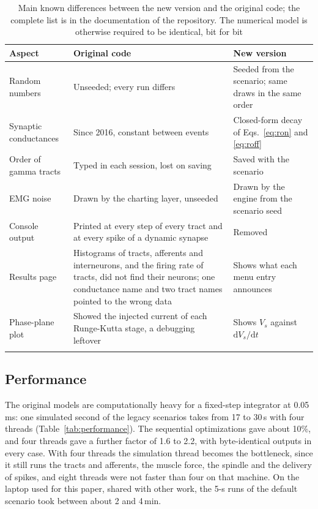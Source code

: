 \documentclass[pdflatex,sn-apa,iicol]{sn-jnl}
\providecommand{\dd}{\mathrm{d}}
\begin{document}
\begin{table}[t]
\caption{Main known differences between the new version and the original code; the complete list is in the documentation of the repository. The numerical model is otherwise required to be identical, bit for bit}\label{tab:deviations}
\begin{tabular}{@{}p{}p{}p{}@{}}
\toprule
Aspect & Original code & New version \\
\midrule
Random numbers & Unseeded; every run differs & Seeded from the scenario; same draws in the same order \\
Synaptic conductances & Since 2016, constant between events & Closed-form decay of Eqs.~\eqref{eq:ron} and \eqref{eq:roff} \\
Order of gamma tracts & Typed in each session, lost on saving & Saved with the scenario \\
EMG noise & Drawn by the charting layer, unseeded & Drawn by the engine from the scenario seed \\
Console output & Printed at every step of every tract and at every spike of a dynamic synapse & Removed \\
Results page & Histograms of tracts, afferents and interneurons, and the firing rate of tracts, did not find their neurons; one conductance name and two tract names pointed to the wrong data & Shows what each menu entry announces \\
Phase-plane plot & Showed the injected current of each Runge-Kutta stage, a debugging leftover & Shows $V_s$ against $\dd V_s / \dd t$ \\
\botrule
\end{tabular}
\end{table}

\subsection{Performance}\label{sec:performance}

The original models are computationally heavy for a fixed-step integrator at 0.05\,ms: one simulated second of the legacy scenarios takes from 17 to 30\,s with four threads (Table~\ref{tab:performance}). The sequential optimizations gave about 10\%, and four threads gave a further factor of 1.6 to 2.2, with byte-identical outputs in every case. With four threads the simulation thread becomes the bottleneck, since it still runs the tracts and afferents, the muscle force, the spindle and the delivery of spikes, and eight threads were not faster than four on that machine. On the laptop used for this paper, shared with other work, the 5-s runs of the default scenario took between about 2 and 4\,min.
\end{document}

